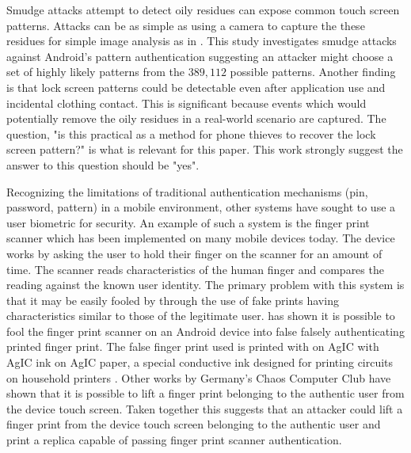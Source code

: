 Smudge attacks attempt to detect
oily residues can expose common touch screen patterns.
%
Attacks can be as simple as using a camera to capture the
these residues for simple image analysis as in
\cite{aviv2010smudge}.
%
This study investigates smudge attacks against
Android's pattern authentication suggesting
an attacker might choose a set of highly likely patterns
from the $389,112$ possible patterns.
%
Another finding is that lock screen patterns could be detectable
even after application use and
incidental clothing contact.
This is significant because 
events which would potentially remove
the oily residues in a real-world scenario
are captured.
%
The question, "is this practical as a method for
phone thieves to recover the lock screen pattern?"
is what is relevant for this paper.
This work \cite{aviv2010smudge}
strongly suggest the answer to
this question should be "yes".

Recognizing the limitations of 
traditional authentication mechanisms (pin, password, pattern)
in a mobile environment,
other systems have sought to use a user biometric 
for security.
%
An example of such a system is the finger print scanner 
which has been implemented on many mobile devices today.
The device works by 
asking the user to hold their finger on the scanner for an amount of time.
The scanner reads characteristics of the human finger and
compares the reading against the known user identity.
%
The primary problem with this system is that it may be easily fooled
by through the use of 
fake prints having characteristics similar to those of the
legitimate user.
%
\cite{cao2016hacking} has shown it is possible to fool the
finger print scanner on an Android device into 
false falsely authenticating printed finger print.
The false finger print used
is printed with on AgIC with AgIC ink on AgIC paper,
a special conductive ink designed for printing circuits
on household printers \cite{AGIC}.
%
Other works by Germany's Chaos Computer Club \cite{CHAOS}
have shown that it is possible to lift a finger print
belonging to the authentic user from the device touch screen.
%
Taken together this suggests that an attacker
could lift a finger print from the device touch screen
belonging to the authentic user and 
print a replica capable of passing 
finger print scanner authentication.

